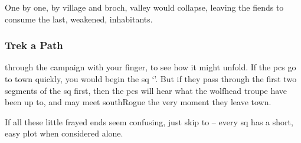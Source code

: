 \begin{multicols}{2}
One by one, by \gls{village} and \gls{broch}, \gls{valley} would collapse, leaving the \glspl{fiend} to consume the last, weakened, inhabitants.

\subsubsection{Trek a Path}
through the \gls{campaign} with your finger, to see how it might unfold.
If the \glspl{pc} go to town quickly, you would begin the \gls{sq} `'.
But if they pass through the first two \glspl{segment} of the  \gls{sq} first, then the \glspl{pc} will hear what the \gls{wolfhead} troupe have been up to, and may meet \gls{southRogue} the very moment they leave \gls{town}.

If all these little frayed ends seem confusing, just skip to   -- every \gls{sq} has a short, easy plot when considered alone.




\renewcommand\csComments{
  \mapCircle{16}{76}{1.7}{Dyson_Logos/bandit_camp}
  \mapCircle{35}{88}{2}{Dyson_Logos/forgotten_city}
  \mapCircle{27}{09}{2}{Dyson_Logos/qualme_temple}
  \mapCircle[4]{56}{52}{2.5}{Dyson_Logos/town}
  \mapCircle{44}{41}{2}{Dyson_Logos/redfall}
  \mapCircle{83}{09}{1.7}{Dyson_Logos/shadow_gate}
  \mapCircle{86}{45}{1.7}{Dyson_Logos/lochside}
  \draw[very thick,white] (11,0.6) -- (12,0.6) node[anchor=north]{\outline{10 Miles}} -- (13,0.6) ;
}



\end{multicols}

\label{sqList}

